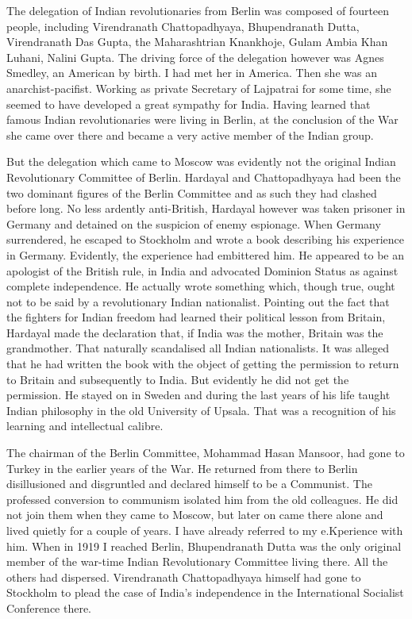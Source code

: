 The delegation of Indian revolutionaries from Berlin was composed of fourteen people, including Virendranath Chattopadhyaya, Bhupendranath Dutta, Virendranath Das Gupta, the Maharashtrian Knankhoje, Gulam Ambia Khan Luhani, Nalini Gupta. The driving force of the delegation however was Agnes Smedley, an American by birth. I had met her in America. Then she was an anarchist-pacifist. Working as private Secretary of Lajpatrai for some time, she seemed to have developed a great sympathy for India. Having learned that famous Indian revolutionaries were living in Berlin, at the conclusion of the War she came over there and became a very active member of the Indian group. 

But the delegation which came to Moscow was evidently not the original Indian Revolutionary Committee of Berlin. Hardayal and Chattopadhyaya had been the two dominant figures of the Berlin Committee and as such they had clashed before long. No less ardently anti-British, Hardayal however was taken prisoner in Germany and detained on the suspicion of enemy espionage. When Germany surrendered, he escaped to Stockholm and wrote a book describing his experience in Germany. Evidently, the experience had embittered him. He appeared to be an apologist of the British rule, in India and advocated Dominion Status as against complete independence. He actually wrote something which, though true, ought not to be said by a revolutionary Indian nationalist. Pointing out the fact that the fighters for Indian freedom had learned their political lesson from Britain, Hardayal made the declaration that, if India was the mother, Britain was the grandmother. That naturally scandalised all Indian nationalists. It was alleged that he had written the book with the object of getting the permission to return to Britain and subsequently to India. But evidently he did not get the permission. He stayed on in Sweden and during the last years of his life taught Indian philosophy in the old University of Upsala. That was a recognition of his learning and intellectual calibre. 

The chairman of the Berlin Committee, Mohammad Hasan Mansoor, had gone to Turkey in the earlier years of the War. He returned from there to Berlin disillusioned and disgruntled and declared himself to be a Communist. The professed conversion to communism isolated him from the old colleagues. He did not join them when they came to Moscow, but later 
on came there alone and lived quietly for a couple of years. I have already referred to my e.Kperience with him. When in 1919 I reached Berlin, Bhupendranath Dutta was the only 
original member of the war-time Indian Revolutionary Committee living there. All the others had dispersed. Virendranath Chattopadhyaya himself had gone to Stockholm to plead the 
case of India's independence in the International Socialist Conference there. 

